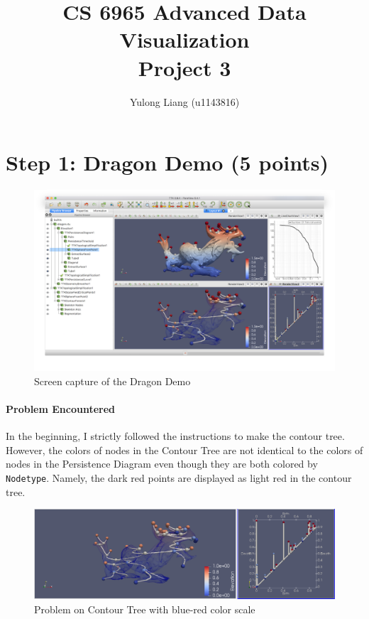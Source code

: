 \documentclass[12pt]{article}
\begin{document}
\title{CS 6965 Advanced Data Visualization\\{\bf Project 3}}
\author{Yulong Liang (u1143816)}
\maketitle

\section*{Step 1: Dragon Demo (5 points)}

\begin{figure}[h]
\centering
\includegraphics[width=1\linewidth]{2.png}
\caption{Screen capture of the Dragon Demo}
\label{fig:name}
\end{figure}

\newpage

\paragraph{Problem Encountered}
In the beginning, I strictly followed the instructions to make the contour tree. However, the colors of nodes in the Contour Tree are not identical to the colors of nodes in the Persistence Diagram even though they are both colored by \texttt{Nodetype}. Namely, the dark red points are displayed as light red in the contour tree.

\begin{figure}[h]
\centering
\includegraphics[width=0.5\linewidth]{2-1.png}
\caption{Problem on Contour Tree with blue-red color scale}
\label{fig:name}
\end{figure}
\end{document}
